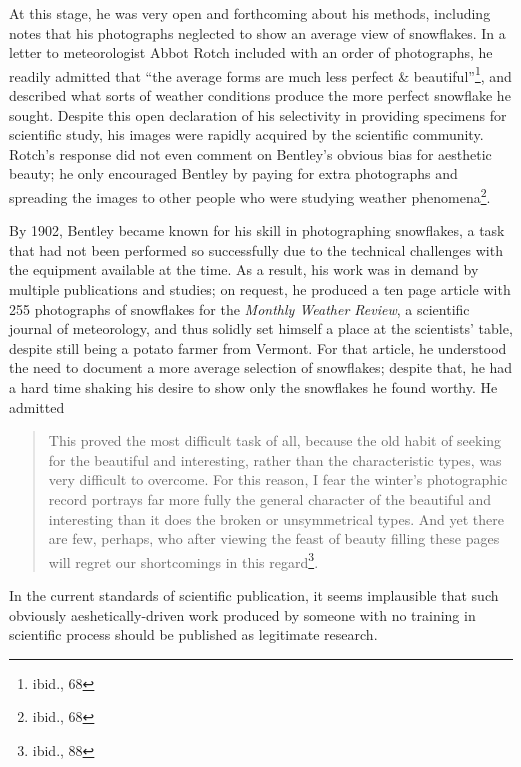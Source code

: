 At this stage, he was very open and forthcoming about his methods, including
notes that his photographs neglected to show an average view of snowflakes. In a
letter to meteorologist Abbot Rotch included with an order of photographs, he
readily admitted that ``the average forms are much less perfect \&
beautiful''\footnote{ibid., 68}, and described what sorts of weather conditions
produce the more perfect snowflake he sought. Despite this open declaration of
his selectivity in providing specimens for scientific study, his images were
rapidly acquired by the scientific community. Rotch's response did not even
comment on Bentley's obvious bias for aesthetic beauty; he only encouraged
Bentley by paying for extra photographs and spreading the images to other people
who were studying weather phenomena\footnote{ibid., 68}.

By 1902, Bentley became known for his skill in photographing snowflakes, a task
that had not been performed so successfully due to the technical challenges with
the equipment available at the time. As a result, his work was in demand by
multiple publications and studies; on request, he produced a ten page article
with 255 photographs of snowflakes for the \textit{Monthly Weather Review}, a
scientific journal of meteorology, and thus solidly set himself a place at the
scientists' table, despite still being a potato farmer from Vermont. For that
article, he understood the need to document a more average selection of
snowflakes; despite that, he had a hard time shaking his desire to show only the
snowflakes he found worthy. He admitted
\begin{quote}
This proved the most difficult task of all, because the old habit of seeking for
the beautiful and interesting, rather than the characteristic types, was very
difficult to overcome. For this reason, I fear the winter's photographic record
portrays far more fully the general character of the beautiful and interesting
than it does the broken or unsymmetrical types. And yet there are few, perhaps,
who after viewing the feast of beauty filling these pages will regret our
shortcomings in this regard\footnote{ibid., 88}.
\end{quote}
In the current standards of scientific publication, it seems implausible that
such obviously aeshetically-driven work produced by someone with no training in
scientific process should be published as legitimate research.

